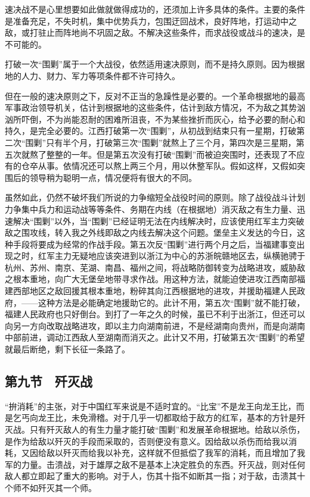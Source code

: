 速决战不是心里想要如此做就做得成功的，还须加上许多具体的条件。主要的条件是准备充足，不失时机，集中优势兵力，包围迂回战术，良好阵地，打运动中之敌，或打驻止而阵地尚不巩固之敌。不解决这些条件，而求战役或战斗的速决，是不可能的。

打破一次“围剿”属于一个大战役，依然适用速决原则，而不是持久原则。因为根据地的人力、财力、军力等项条件都不许可持久。

但在一般的速决原则之下，反对不正当的急躁性是必要的。一个革命根据地的最高军事政治领导机关，估计到根据地的这些条件，估计到敌方情况，不为敌之其势汹汹所吓倒，不为尚能忍耐的困难所沮丧，不为某些挫折而灰心，给予必要的耐心和持久，是完全必要的。江西打破第一次“围剿”，从初战到结束只有一星期，打破第二次“围剿”只有半个月，打破第三次“围剿”就熬上了三个月，第四次是三星期，第五次就熬了整整的一年。但是第五次没有打破“围剿”而被迫突围时，还表现了不应有的仓卒从事。依情况还可以熬上两三个月，用以休整军队。假如这样，又假如突围后的领导稍为聪明一点，情况便将有很大的不同。

虽然如此，仍然不破坏我们所说的力争缩短全战役时间的原则。除了战役战斗计划力争集中兵力和运动战等等条件、务期在内线（在根据地）消灭敌之有生力量、迅速解决“围剿”以外，当“围剿”已经证明无法在内线解决时，应该使用红军主力突破敌之围攻线，转入我之外线即敌之内线去解决这个问题。堡垒主义发达的今日，这种手段将要成为经常的作战手段。第五次反“围剿”进行两个月之后，当福建事变出现之时，红军主力无疑地应该突进到以浙江为中心的苏浙皖赣地区去，纵横驰骋于杭州、苏州、南京、芜湖、南昌、福州之间，将战略防御转变为战略进攻，威胁敌之根本重地，向广大无堡垒地带寻求作战。用这种方法，就能迫使进攻江西南部福建西部地区之敌回援其根本重地，粉碎其向江西根据地的进攻，并援助福建人民政府，——这种方法是必能确定地援助它的。此计不用，第五次“围剿”就不能打破，福建人民政府也只好倒台。到打了一年之久的时候，虽已不利于出浙江，但还可以向另一方向改取战略进攻，即以主力向湖南前进，不是经湖南向贵州，而是向湖南中部前进，调动江西敌人至湖南而消灭之。此计又不用，打破第五次“围剿”的希望就最后断绝，剩下长征一条路了。

\subsection{第九节　歼灭战}

“拚消耗”的主张，对于中国红军来说是不适时宜的。“比宝”不是龙王向龙王比，而是乞丐向龙王比，未免滑稽。对于几乎一切都取给于敌方的红军，基本的方针是歼灭战。只有歼灭敌人的有生力量才能打破“围剿”和发展革命根据地。给敌以杀伤，是作为给敌以歼灭的手段而采取的，否则便没有意义。因给敌以杀伤而给我以消耗，又因给敌以歼灭而给我以补充，这样就不但抵偿了我军的消耗，而且增加了我军的力量。击溃战，对于雄厚之敌不是基本上决定胜负的东西。歼灭战，则对任何敌人都立即起了重大的影响。对于人，伤其十指不如断其一指；对于敌，击溃其十个师不如歼灭其一个师。


